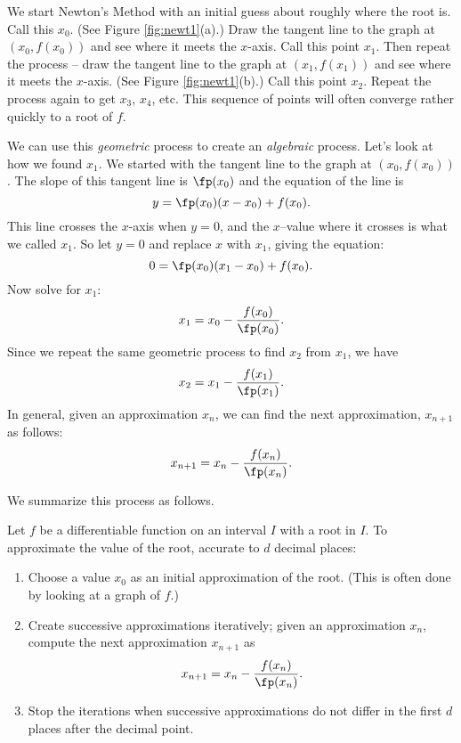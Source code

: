 We start Newton's Method with an initial guess about roughly where the root is.  Call this $x_0$. (See Figure \ref{fig:newt1}(a).)  Draw the tangent line to the graph at $(x_0,f(x_0))$ and see where it meets the $x$-axis. Call this point $x_1$.  Then repeat the process -- draw the tangent line to the graph at $(x_1, f(x_1))$ and see where it meets the $x$-axis. (See Figure \ref{fig:newt1}(b).) Call this point $x_2$.  Repeat the process again to get $x_3$, $x_4$, etc.  This sequence of points will often converge rather quickly to a root of $f$.  

We can use this \textit{geometric} process to create an \textit{algebraic} process.  Let's look at how we found $x_1$.  We started with the tangent line to the graph at $(x_0,f(x_0))$.  The slope of this tangent line is $\fp(x_0)$ and the equation of the line is
\[
y=\fp(x_0)(x-x_0)+f(x_0).
\]
This line crosses the $x$-axis when $y=0$, and the $x$--value where it crosses is what we called $x_1$. So let $y=0$ and replace $x$ with $x_1$, giving the equation: 
\[
 0 = \fp(x_0)(x_1-x_0)+f(x_0).
\] 
Now solve for $x_1$:
\[
x_1=x_0-\frac{f(x_0)}{\fp(x_0)}.
\]
Since we repeat the same geometric process to find $x_2$ from $x_1$, we have
\[
x_2=x_1-\frac{f(x_1)}{\fp(x_1)}.
\]
In general, given an approximation $x_n$, we can find the next approximation, $x_{n+1}$ as follows:
\[
x_{n+1} = x_{n} - \frac{f(x_{n})}{\fp(x_{n})}.
\]

We summarize this process as follows.

{Let $f$ be a differentiable function on an interval $I$ with a root in $I$. To approximate the value of the root, accurate to $d$ decimal places:
	\begin{enumerate}
	\item		Choose a value $x_0$ as an initial approximation of the root. (This is often done by looking at a graph of $f$.)
	\item		Create successive approximations iteratively; given an approximation $x_n$, compute the next approximation $x_{n+1}$ as 
	\[
	x_{n+1} = x_n - \frac{f(x_n)}{\fp(x_n)}.
	\]
	\item		Stop the iterations when successive approximations do not differ in the first $d$ places after the decimal point.
		\end{enumerate}
}


